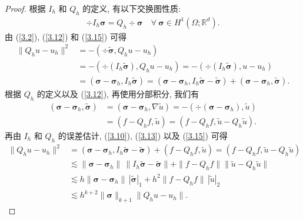 \begin{proof}
根据 $I_h$ 和 $Q_h$ 的定义, 有以下交换图性质:
\begin{align}
\label{3.15}
\div I_h\boldsymbol\sigma=Q_h\div\boldsymbol\sigma \quad \forall \ \boldsymbol\sigma\in H^1(\Omega;\mathbb{R}^d).
\end{align}
由 (\ref{3.2}), (\ref{3.12}) 和 (\ref{3.15}) 可得
\begin{align*}
\|Q_h u-u_h\|^2&=-(\div\widetilde{\boldsymbol{\sigma}}, Q_h u-u_h)\\
&=-(\div(I_h\widetilde{\boldsymbol{\sigma}}),Q_h u-u_h)=-(\div(I_h\widetilde{\boldsymbol{\sigma}}),u-u_h)\\
&=(\boldsymbol\sigma-\boldsymbol\sigma_h,I_h\widetilde{\boldsymbol{\sigma}})=(\boldsymbol\sigma-\boldsymbol\sigma_h,I_h\widetilde{\boldsymbol{\sigma}}-\widetilde{\boldsymbol{\sigma}})+(\boldsymbol\sigma-\boldsymbol\sigma_h,\widetilde{\boldsymbol{\sigma}}).
\end{align*}
根据 $Q_h$ 的定义以及 (\ref{3.12}), 再使用分部积分, 我们有
\begin{align*}
(\boldsymbol\sigma-\boldsymbol\sigma_h,\widetilde{\boldsymbol{\sigma}})&=(\boldsymbol\sigma-\boldsymbol\sigma_h,\nabla\widetilde{u})=-(\div(\boldsymbol\sigma-\boldsymbol\sigma_h),\widetilde{u})\\
&=(f-Q_hf,\widetilde{u}) =(f-Q_hf,\widetilde{u}-Q_h\widetilde{u}).
\end{align*}
再由 $I_h$ 和 $Q_h$ 的误差估计, (\ref{3.10}), (\ref{3.13}) 以及 (\ref{3.15}) 可得
\begin{align*}
\|Q_h u-u_h\|^2&=(\boldsymbol\sigma-\boldsymbol\sigma_h,I_h\widetilde{\boldsymbol{\sigma}}-\widetilde{\boldsymbol{\sigma}}) + (f-Q_hf,\widetilde{u}) =(f-Q_hf,\widetilde{u}-Q_h\widetilde{u}) \\
&\lesssim\|\boldsymbol\sigma-\boldsymbol\sigma_h\|\,\|I_h\widetilde{\boldsymbol{\sigma}}-\widetilde{\boldsymbol{\sigma}}\|+\|f-Q_hf\|\|\widetilde{u}-Q_h\widetilde{u}\|\\
&\lesssim h\|\boldsymbol\sigma-\boldsymbol\sigma_h\|\,|\widetilde{\boldsymbol{\sigma}}|_1+h^2\|f-Q_hf\|\,|\widetilde{u}|_2\\
&\lesssim h^{k+2}\|\boldsymbol\sigma\|_{k+1}\|Q_h u-u_h\|.
\end{align*}
\end{proof}

